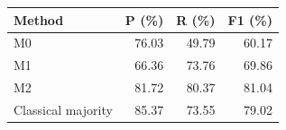 \begingroup\small\setlength{\tabcolsep}{3pt}
\begin{tabular*}{\linewidth}{@{\extracolsep{\fill}}lrrr@{}}
\toprule
Method & P (\%) & R (\%) & F1 (\%) \\
\midrule
M0 & 76.03 & 49.79 & 60.17 \\
M1 & 66.36 & 73.76 & 69.86 \\
M2 & 81.72 & 80.37 & 81.04 \\
Classical majority & 85.37 & 73.55 & 79.02 \\
\bottomrule
\end{tabular*}
\endgroup

